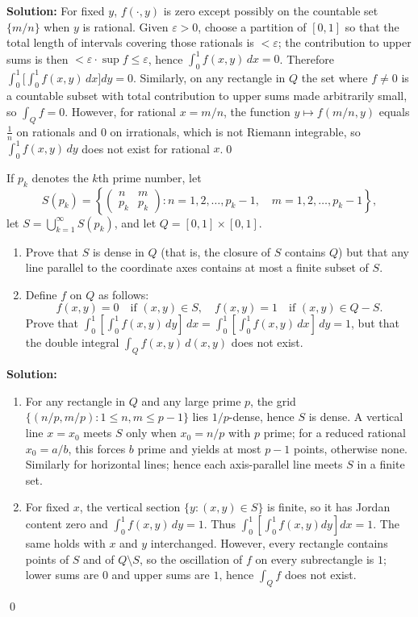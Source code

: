 \noindent\textbf{Solution:}
For fixed $y$, $f(\cdot,y)$ is zero except possibly on the countable set $\{m/n\}$ when $y$ is rational. Given $\varepsilon>0$, choose a partition of $[0,1]$ so that the total length of intervals covering those rationals is $<\varepsilon$; the contribution to upper sums is then $<\varepsilon\cdot\sup f\le \varepsilon$, hence $\int_0^1 f(x,y)\,dx=0$. Therefore $\int_0^1\!\Big[\int_0^1 f(x,y)\,dx\Big]dy=0$.
Similarly, on any rectangle in $Q$ the set where $f\ne 0$ is a countable subset with total contribution to upper sums made arbitrarily small, so $\int_Q f=0$. However, for rational $x=m/n$, the function $y\mapsto f(m/n,y)$ equals $\tfrac{1}{n}$ on rationals and $0$ on irrationals, which is not Riemann integrable, so $\int_0^1 f(x,y)\,dy$ does not exist for rational $x$.\qed


\begin{problembox}
If \( p_k \) denotes the \( k \)th prime number, let
\[S(p_k) = \left\{ \begin{pmatrix}
n & m \\
p_k & p_k
\end{pmatrix} : n = 1, 2, \ldots, p_k - 1, \quad m = 1, 2, \ldots, p_k - 1 \right\},\]
let \( S = \bigcup_{k=1}^{\infty} S(p_k) \), and let \( Q = [0, 1] \times [0, 1] \).

\begin{enumerate}[label=(\alph*)]
    \item Prove that \( S \) is dense in \( Q \) (that is, the closure of \( S \) contains \( Q \)) but that any line parallel to the coordinate axes contains at most a finite subset of \( S \).
    
    \item Define \( f \) on \( Q \) as follows:
    \[f(x, y) = 0 \quad \text{if } (x, y) \in S, \quad f(x, y) = 1 \quad \text{if } (x, y) \in Q - S.\]
    Prove that \( \int_{0}^{1} \left[ \int_{0}^{1} f(x, y) \, dy \right] \, dx = \int_{0}^{1} \left[ \int_{0}^{1} f(x, y) \, dx \right] \, dy = 1 \), but that the double integral \( \int_{Q} f(x, y) \, d(x, y) \) does not exist.
\end{enumerate}
\end{problembox}

\noindent\textbf{Solution:}
\begin{enumerate}[label=(\alph*)]
    \item For any rectangle in $Q$ and any large prime $p$, the grid $\{(n/p,m/p):1\le n,m\le p-1\}$ lies $1/p$-dense, hence $S$ is dense. A vertical line $x=x_0$ meets $S$ only when $x_0=n/p$ with $p$ prime; for a reduced rational $x_0=a/b$, this forces $b$ prime and yields at most $p-1$ points, otherwise none. Similarly for horizontal lines; hence each axis-parallel line meets $S$ in a finite set.
    \item For fixed $x$, the vertical section $\{y:(x,y)\in S\}$ is finite, so it has Jordan content zero and $\int_0^1 f(x,y)\,dy=1$. Thus $\int_0^1\![\int_0^1 f(x,y)dy]dx=1$. The same holds with $x$ and $y$ interchanged. However, every rectangle contains points of $S$ and of $Q\setminus S$, so the oscillation of $f$ on every subrectangle is $1$; lower sums are $0$ and upper sums are $1$, hence $\int_Q f$ does not exist.
\end{enumerate}\qed
